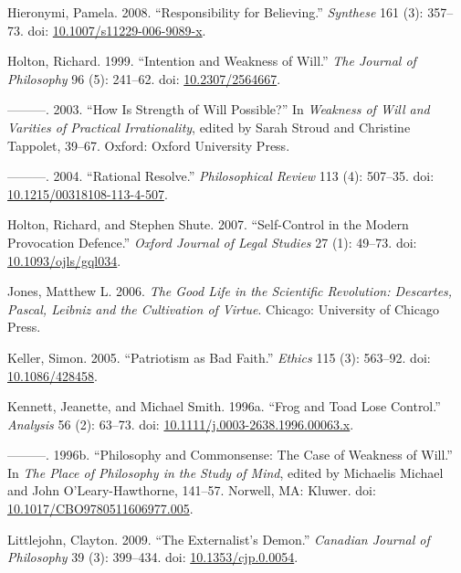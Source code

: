 \documentclass[
  11pt,
  letterpaper,
  DIV=11,
  numbers=noendperiod,
  twoside]{scrartcl}
\newlength{\cslhangindent}
\newenvironment{CSLReferences}[2] %
 {\begin{list}{}{%
  \setlength{\itemindent}{0pt}
  \setlength{\leftmargin}{0pt}
  \setlength{\parsep}{0pt}
  \ifodd #1
   \setlength{\leftmargin}{\cslhangindent}
   \setlength{\itemindent}{-1\cslhangindent}
  \fi
  \setlength{\itemsep}{#2\baselineskip}}}
 {\end{list}}
\begin{document}
\begin{CSLReferences}{1}{0}
Hieronymi, Pamela. 2008. {``Responsibility for Believing.''}
\emph{Synthese} 161 (3): 357--73. doi:
\href{https://doi.org/10.1007/s11229-006-9089-x}{10.1007/s11229-006-9089-x}.

Holton, Richard. 1999. {``Intention and Weakness of Will.''} \emph{The
Journal of Philosophy} 96 (5): 241--62. doi:
\href{https://doi.org/10.2307/2564667}{10.2307/2564667}.

---------. 2003. {``How Is Strength of Will Possible?''} In
\emph{Weakness of Will and Varities of Practical Irrationality}, edited
by Sarah Stroud and Christine Tappolet, 39--67. Oxford: Oxford
University Press.

---------. 2004. {``Rational Resolve.''} \emph{Philosophical Review} 113
(4): 507--35. doi:
\href{https://doi.org/10.1215/00318108-113-4-507}{10.1215/00318108-113-4-507}.

Holton, Richard, and Stephen Shute. 2007. {``Self-Control in the Modern
Provocation Defence.''} \emph{Oxford Journal of Legal Studies} 27 (1):
49--73. doi:
\href{https://doi.org/10.1093/ojls/gql034}{10.1093/ojls/gql034}.

Jones, Matthew L. 2006. \emph{The Good Life in the Scientific
Revolution: Descartes, Pascal, Leibniz and the Cultivation of Virtue}.
Chicago: University of Chicago Press.

Keller, Simon. 2005. {``Patriotism as Bad Faith.''} \emph{Ethics} 115
(3): 563--92. doi:
\href{https://doi.org/10.1086/428458}{10.1086/428458}.

Kennett, Jeanette, and Michael Smith. 1996a. {``Frog and Toad Lose
Control.''} \emph{Analysis} 56 (2): 63--73. doi:
\href{https://doi.org/10.1111/j.0003-2638.1996.00063.x}{10.1111/j.0003-2638.1996.00063.x}.

---------. 1996b. {``Philosophy and Commonsense: The Case of Weakness of
Will.''} In \emph{The Place of Philosophy in the Study of Mind}, edited
by Michaelis Michael and John O'Leary-Hawthorne, 141--57. Norwell, MA:
Kluwer. doi:
\href{https://doi.org/10.1017/CBO9780511606977.005}{10.1017/CBO9780511606977.005}.

Littlejohn, Clayton. 2009. {``The Externalist's Demon.''} \emph{Canadian
Journal of Philosophy} 39 (3): 399--434. doi:
\href{https://doi.org/10.1353/cjp.0.0054}{10.1353/cjp.0.0054}.


\end{CSLReferences}
\end{document}

